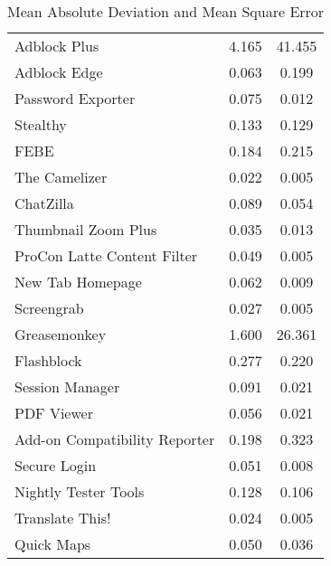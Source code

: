 \documentclass[mksc,nonblindrev]{informs3}
\begin{document}
\begin{table}
\begin{tabular}{lcc}
		Adblock Plus	&	4.165	&	41.455	\\
		Adblock Edge	&	0.063	&	0.199	\\
		Password Exporter 	&	0.075	&	0.012	\\
		Stealthy	&	0.133	&	0.129	\\
		FEBE	&	0.184	&	0.215	\\
		The Camelizer	&	0.022	&	0.005	\\
		ChatZilla 	&	0.089	&	0.054	\\
		Thumbnail Zoom Plus	&	0.035	&	0.013	\\
		ProCon Latte Content Filter	&	0.049	&	0.005	\\
		 New Tab Homepage	&	0.062	&	0.009	\\
		Screengrab	&	0.027	&	0.005	\\
		Greasemonkey	&	1.600	&	26.361	\\
		Flashblock	&	0.277	&	0.220	\\
		Session Manager	&	0.091	&	0.021	\\
		PDF Viewer	&	0.056	&	0.021	\\
		Add-on Compatibility Reporter	&	0.198	&	0.323	\\
		Secure Login	&	0.051	&	0.008	\\
		Nightly Tester Tools	&	0.128	&	0.106	\\
		Translate This!	&	0.024	&	0.005	\\
		Quick Maps	&	0.050	&	0.036	\\ \hline
		\end{tabular}
	\caption{Mean Absolute Deviation and Mean Square Error}
	\label{tab:MeanAbsoluteDeviationAndMeanSquareError}
\end{table}
\end{document}
